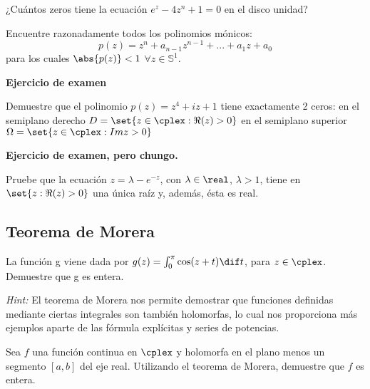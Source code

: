 \begin{problem}

¿Cuántos zeros tiene la ecuación $e^z - 4 z^n + 1 = 0$ en el disco unidad?
\solution

\end{problem}

\begin{problem}
Encuentre razonadamente todos los polinomios mónicos:
\[ p(z) = z^n + a_{n-1} z^{n-1} + ... + a_1 z + a_0 \]
para los cuales $\abs{p(z)} < 1$ $\forall z \in \mathbb{S}^1$.
\solution

\end{problem}

\begin{problem} {\bf Ejercicio de examen}

Demuestre que el polinomio $p(z) = z^4 + iz + 1$ tiene exactamente 2 ceros:
\ppart en el semiplano derecho $D = \set{z \in \cplex : \Re(z) > 0}$
\ppart en el semiplano superior $\Omega = \set{z \in \cplex : Im z > 0}$
\solution

\end{problem}

\begin{problem} {\bf Ejercicio de examen, pero chungo.}

Pruebe que la ecuación $z = \lambda - e^{-z}$, con $\lambda \in \real$, $\lambda > 1$, tiene en $\set{z : \Re(z) > 0} $ una única raíz y, además, ésta es real.
\solution

\end{problem}

\subsection{Teorema de Morera}
\begin{problem}

La función g viene dada por $g(z) = \int_{0}^{\pi} \cos(z + t) \dif t$, para $z \in \cplex$. Demuestre que g es entera.

{\it Hint:} El teorema de Morera nos permite demostrar que funciones definidas mediante ciertas integrales son también holomorfas, lo cual nos proporciona más ejemplos aparte de las fórmula explícitas y series de potencias.
\solution

\end{problem}

\begin{problem}
Sea $f$ una función continua en $\cplex$ y holomorfa en el plano menos un segmento $ [ a, b ] $ del eje real. Utilizando el teorema de Morera, demuestre que $f$ es entera.
\solution

\end{problem}


